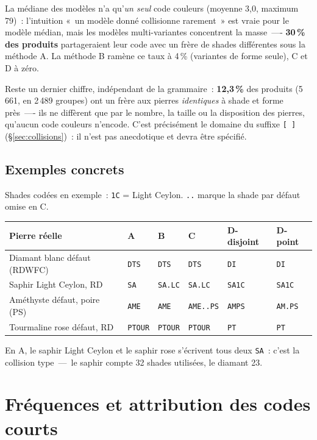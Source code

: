 \documentclass[11pt,a4paper]{article}
\newcommand{\code}[1]{\texttt{#1}}
\begin{document}
La médiane des modèles n'a qu'\emph{un seul} code couleurs (moyenne 3,0,
maximum 79)~: l'intuition «~un modèle donné collisionne rarement~» est
vraie pour le modèle médian, mais les modèles multi-variantes concentrent
la masse~—- \textbf{30\,\% des produits} partageraient leur code avec un
frère de shades différentes sous la méthode A. La méthode B ramène ce
taux à 4\,\% (variantes de forme seule), C et D à zéro.

Reste un dernier chiffre, indépendant de la grammaire~: \textbf{12,3\,\%}
des produits (5\,661, en 2\,489 groupes) ont un frère aux pierres
\emph{identiques} à shade et forme près~—- ils ne diffèrent que par le
nombre, la taille ou la disposition des pierres, qu'aucun code couleurs
n'encode. C'est précisément le domaine du suffixe \code{[\,]}
(§\ref{sec:collisions})~: il n'est pas anecdotique et devra être
spécifié.

\subsection{Exemples concrets}

Shades codées en exemple~: \code{1C} = Light Ceylon. \code{..} marque la
shade par défaut omise en C.

\begin{center}
\small
\begin{tabular}{l l l l l l}
\toprule
Pierre réelle & A & B & C & D-disjoint & D-point \\
\midrule
Diamant blanc défaut (RDWFC)      & \code{DTS}   & \code{DTS}    & \code{DTS}      & \code{DI}   & \code{DI} \\
Saphir Light Ceylon, RD           & \code{SA}    & \code{SA.LC}  & \code{SA.LC}    & \code{SA1C} & \code{SA1C} \\
Améthyste défaut, poire (PS)      & \code{AME}   & \code{AME}    & \code{AME..PS}  & \code{AMPS} & \code{AM.PS} \\
Tourmaline rose défaut, RD        & \code{PTOUR} & \code{PTOUR}  & \code{PTOUR}    & \code{PT}   & \code{PT} \\
\bottomrule
\end{tabular}
\end{center}

En A, le saphir Light Ceylon et le saphir rose s'écrivent tous deux
\code{SA}~: c'est la collision type~—~le saphir compte 32 shades utilisées,
le diamant 23.

\section{Fréquences et attribution des codes courts}
\end{document}
